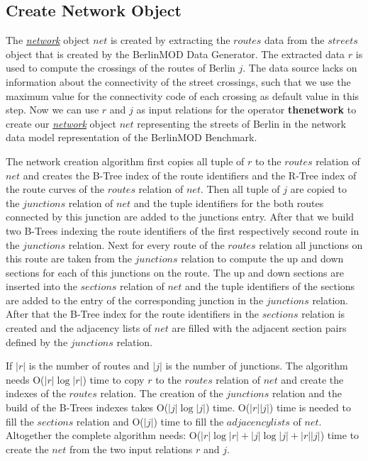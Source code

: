 \documentclass[a4paper]{article}
\newcommand{\bmodb} {BerlinMOD Benchmark}
\newcommand{\op}[1]{\textbf{#1}}
\newcommand{\dt}[1]{\textsl{\underline{#1}}}
\begin{document}
{\subsection{Create Network Object}
\label{sec:createNetwork}
The \dt{network} object $net$ is created by extracting the $routes$ data from
the $streets$ object that is created by the BerlinMOD Data Generator.
The extracted data $r$ is used to compute the crossings of the
routes of Berlin $j$. The data source lacks on information about the connectivity
of the street crossings, such that we use the maximum value for the connectivity
code of each crossing as default value in this step.
Now we can use $r$ and $j$ as input relations for the operator \op{thenetwork}
to create our \dt{network} object $net$ representing the streets of Berlin in
the network data model representation of the \bmodb{}.

The network creation algorithm first copies all tuple of $r$ to the
$routes$ relation of $net$ and creates the B-Tree index of the route
identifiers and the R-Tree index of the route curves of the $routes$ relation of
$net$. Then all tuple of $j$ are copied to the $junctions$ relation
of $net$ and the tuple identifiers for the both routes connected
by this junction are added to the junctions entry. After that we build two B-Trees
indexing the route identifiers of the first respectively second route in the
$junctions$ relation. Next for every route of the $routes$ relation all junctions
on this route are taken from the $junctions$ relation to compute the up and
down sections for each of this junctions on the route. The up and down
sections are inserted into the $sections$ relation of $net$ and the
tuple identifiers of the sections are added to the entry of the corresponding
junction in the $junctions$ relation. After that the B-Tree index for the
route identifiers in the $sections$ relation is created and the adjacency
lists of $net$ are filled with the adjacent section pairs defined by the
$junctions$ relation.

If $|r|$ is the number of routes and $|j|$ is the number of junctions.
The algorithm needs O($|r| \log |r|$) time to copy $r$ to the
$routes$ relation of $net$ and create the indexes of the
$routes$ relation. The creation of the $junctions$ relation and the build
of the B-Trees indexes takes O($|j| \log |j|$) time.
O($|r||j|$) time is needed to fill the $sections$ relation and
O($|j|$) time to fill the $adjacency lists$ of $net$. Altogether
the complete algorithm needs:
O($|r| \log |r|+|j| \log |j| + |r||j|$)
time to create the $net$ from the two input relations $r$ and $j$.
}
\end{document}

